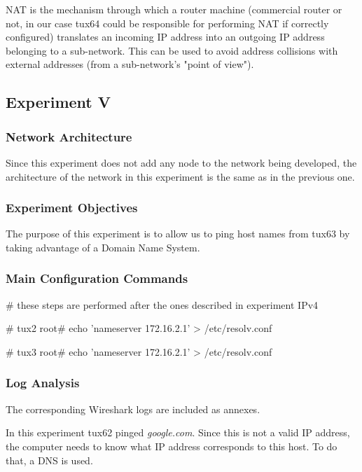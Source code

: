 \documentclass[11pt,a4paper,twocolumn]{article}
\begin{document}
NAT is the mechanism through which a router machine (commercial router or not, in our case tux64 could be responsible for performing NAT if correctly configured) translates an incoming IP address into an outgoing IP address belonging to a sub-network. This can be used to avoid address collisions with external addresses (from a sub-network's "point of view").

\subsection{Experiment V}

\subsubsection{Network Architecture}

Since this experiment does not add any node to the network being developed, the architecture of the network in this experiment is the same as in the previous one.

\subsubsection{Experiment Objectives}

The purpose of this experiment is to allow us to ping host names from tux63 by taking advantage of a Domain Name System.

\subsubsection{Main Configuration Commands}

\begin{code-bash}
# these steps are performed after the ones described in experiment IPv4

# tux2
root# echo 'nameserver 172.16.2.1' > /etc/resolv.conf

# tux3
root# echo 'nameserver 172.16.2.1' > /etc/resolv.conf

\end{code-bash}

\subsubsection{Log Analysis}

The corresponding Wireshark logs are included as annexes.

In this experiment tux62 pinged \textit{google.com}. Since this is not a valid IP address, the computer needs to know what IP address corresponds to this host. To do that, a DNS is used.
\end{document}
